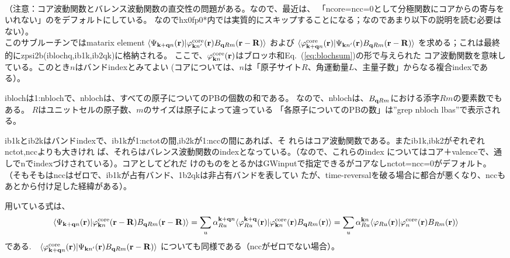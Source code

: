 \documentclass[twocolumn,showpacs,preprintnumbers,amsmath,amssymb,floatfix]{revtex4-1}
\newcommand{\bfq}{{\bf q}}
\newcommand{\bfk}{{\bf k}}
\newcommand{\bfr}{{\bf r}}
\newcommand{\bfR}{{\bf R}}
\newcommand{\req}[1]{\mbox{Eq.~\!(\ref{#1})}}
\def\Psikqn{{\Psi_{{\bf k}+{\bf q} n}}}
\begin{document}
\begin{widetext}
 \\
（注意：コア波動関数とバレンス波動関数の直交性の問題がある。なので、最近は、
「ncore=ncc=0として分極関数にコアからの寄与をいれない」のをデフォルトにしている。
なのでhx0fp0*内では実質的にスキップすることになる；なのであまり以下の説明を読む必要はない）。\\
このサブルーチンではmatarix element 
$\langle\Psikqn(\bfr)| \varphi^{\rm core}_{\bfk n'}(\bfr) B_{\bfq Rm}(\bfr-\bfR) \rangle$
および
$\langle\varphi^{\rm core}_{\bfk+\bfq n}(\bfr)| \Psi_{\bfk n'}(\bfr) B_{\bfq Rm}(\bfr-\bfR) \rangle$
を求める；これは最終的にzpsi2b(iblochq,ib1k,ib2qk)に格納される。
ここで、$\varphi^{\rm core}_{\bfk n}(\bfr)$はブロッホ和\req{eq:blochsum}の形で与えられた
コア波動関数を意味している。このとき$n$はバンドindexとみてよい
(コアについては、$n$は「原子サイト$R$、角運動量$L$、主量子数」からなる複合indexである）。

iblochは1:nblochで、nblochは、すべての原子についてのPBの個数の和である。
なので、nblochは、$B_{\bfq Rm}$における添字$Rm$の要素数でもある。
$R$はユニットセルの原子数、$m$のサイズは原子によって違っている
「各原子についてのPBの数」は”grep nbloch lbas”で表示される。

ib1kとib2kはバンドindexで、ib1kが1:nctotの間,ib2kが1:nccの間にあれば、そ
れらはコア波動関数である。またib1k,ibk2がぞれぞれnctot,nccよりも大きけれ
ば、それらはバレンス波動関数のindexとなっている。（なので、これらのindex
についてはコア＋valenceで、通しでnでindexづけされている）。コアとしてどれだ
けのものをとるかはGWinputで指定できるがコアなしnctot=ncc=0がデフォルト。
（そもそもはnccはゼロで、ib1kが占有バンド、1b2qkは非占有バンドを表してい
たが、time-reversalを破る場合に都合が悪くなり、nccもあとから付け足した経緯がある）。

用いている式は、
\begin{eqnarray}
\langle\Psikqn(\bfr)| \varphi^{\rm core}_{\bfk n}(\bfr-\bfR) B_{\bfq Rm}(\bfr-\bfR) \rangle
= \sum_{u} \alpha^{\bfk+\bfq n}_{Ru} 
\langle \varphi^{\bf k+q}_{Ru}(\bfr)|\varphi^{\rm core}_{{\bf k} n}(\bfr) B_{\bfq Rm}(\bfr) \rangle
= \sum_{u} \alpha^{\bfk n}_{Ru} 
\langle \varphi_{Ru}(\bfr)|\varphi^{\rm core}_{n}(\bfr) B_{Rm}(\bfr) \rangle
\nonumber \\
\end{eqnarray}
である.　$\langle\varphi^{\rm core}_{\bfk+\bfq n}(\bfr)| \Psi_{\bfk n'}(\bfr) B_{\bfq Rm}(\bfr-\bfR) \rangle$
についても同様である（nccがゼロでない場合）。


\end{widetext}
\end{document}
